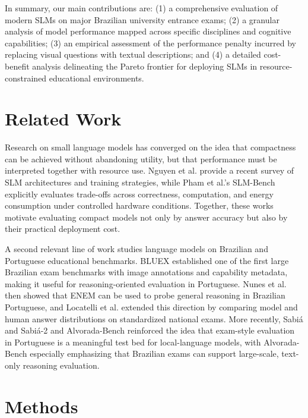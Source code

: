 \documentclass[12pt]{article}
\begin{document}
In summary, our main contributions are: (1) a comprehensive evaluation of modern SLMs on major Brazilian university entrance exams; (2) a granular analysis of model performance mapped across specific disciplines and cognitive capabilities; (3) an empirical assessment of the performance penalty incurred by replacing visual questions with textual descriptions; and (4) a detailed cost-benefit analysis delineating the Pareto frontier for deploying SLMs in resource-constrained educational environments.

\section{Related Work}
\label{sec:related}
Research on small language models has converged on the idea that compactness can be achieved without abandoning utility, but that performance must be interpreted together with resource use. Nguyen et al. \cite{nguyen2025survey} provide a recent survey of SLM architectures and training strategies, while Pham et al.'s SLM-Bench \cite{pham2025slmbench} explicitly evaluates trade-offs across correctness, computation, and energy consumption under controlled hardware conditions. Together, these works motivate evaluating compact models not only by answer accuracy but also by their practical deployment cost.

A second relevant line of work studies language models on Brazilian and Portuguese educational benchmarks. BLUEX \cite{almeida2023bluex} established one of the first large Brazilian exam benchmarks with image annotations and capability metadata, making it useful for reasoning-oriented evaluation in Portuguese. Nunes et al. \cite{nunes2023evaluating} then showed that ENEM can be used to probe general reasoning in Brazilian Portuguese, and Locatelli et al. \cite{locatelli2024examining} extended this direction by comparing model and human answer distributions on standardized national exams. More recently, Sabiá and Sabiá-2 \cite{pires2023sabia,almeida2024sabia} and Alvorada-Bench \cite{godoy2025alvorada} reinforced the idea that exam-style evaluation in Portuguese is a meaningful test bed for local-language models, with Alvorada-Bench especially emphasizing that Brazilian exams can support large-scale, text-only reasoning evaluation.

\section{Methods}
\label{sec:methods}
\end{document}
